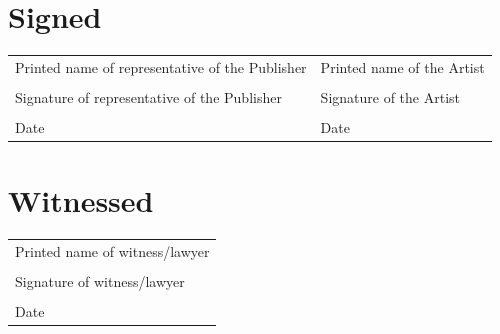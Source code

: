 \documentclass[12pt,letterpaper]{article}
\begin{document}
\thispagestyle{final}

\section*{Signed}

\begin{tabular}{p{3in} | p{3in}}
    \vspace{0.5in} & \\ \hline
    Printed name of representative of the Publisher & Printed name of the Artist \\
    \vspace{0.5in} & \\ \hline
    Signature of representative of the Publisher & Signature of the Artist \\
    \vspace{0.5in} & \\ \hline
    Date & Date \\
\end{tabular}

\section*{Witnessed}

\begin{tabular}{l}
    \vspace{0.5in} \\ \hline
    Printed name of witness/lawyer \\
    \vspace{0.5in} \\ \hline
    Signature of witness/lawyer \\
    \vspace{0.5in} \\ \hline
    Date \\
\end{tabular}
\end{document}
